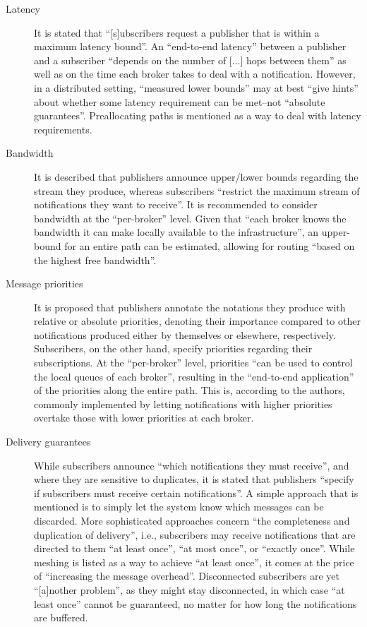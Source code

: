 \documentclass[article, type=bsc, colorback, accentcolor=tud8b, parskip=half, bibliography=totocnumbered]{tudthesis}
\begin{document}
\begin{description}

\item[Latency]
It is stated that ``[s]ubscribers request a publisher that is within a maximum latency bound''.
An ``end-to-end latency'' between a publisher and a subscriber ``depends on the number of [...] hops between them'' as well as on the time each broker takes to deal with a notification.
However, in a distributed setting, ``measured lower bounds'' may at best ``give hints'' about whether some latency requirement can be met--not ``absolute guarantees''.
Preallocating paths is mentioned as a way to deal with latency requirements.

\item[Bandwidth]
It is described that publishers announce upper/lower bounds regarding the stream they produce, whereas subscribers ``restrict the maximum stream of notifications they want to receive''.
It is recommended to consider bandwidth at the ``per-broker'' level.
Given that ``each broker knows the bandwidth it can make locally available to the infrastructure'', an upper-bound for an entire path can be estimated, allowing for routing ``based on the highest free bandwidth''.

\item[Message priorities]
It is proposed that publishers annotate the notations they produce with relative or absolute priorities, denoting their importance compared to other notifications produced either by themselves or elsewhere, respectively.
Subscribers, on the other hand, specify priorities regarding their subscriptions.
At the ``per-broker'' level, priorities ``can be used to control the local queues of each broker'', resulting in the ``end-to-end application'' of the priorities along the entire path.
This is, according to the authors, commonly implemented by letting notifications with higher priorities overtake those with lower priorities at each broker.

\item[Delivery guarantees]
While subscribers announce ``which notifications they must receive'', and where they are sensitive to duplicates, it is stated that publishers ``specify if subscribers must receive certain notifications''.
A simple approach that is mentioned is to simply let the system know which messages can be discarded.
More sophisticated approaches concern ``the completeness and duplication of delivery'', i.e., subscribers may receive notifications that are directed to them ``at least once'', ``at most once'', or ``exactly once''.
While meshing is listed as a way to achieve ``at least once'', it comes at the price of ``increasing the message overhead''.
Disconnected subscribers are yet ``[a]nother problem'', as they might stay disconnected, in which case ``at least once'' cannot be guaranteed, no matter for how long the notifications are buffered.


\end{description}
\end{document}
